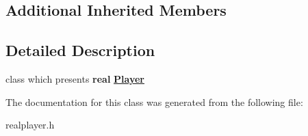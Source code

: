 \subsection*{Additional Inherited Members}


\subsection{Detailed Description}
class which presents {\bfseries{real}} {\bfseries{\mbox{\hyperlink{class_player}{Player}}}} 

The documentation for this class was generated from the following file\+:\begin{DoxyCompactItemize}
\item 
realplayer.\+h\end{DoxyCompactItemize}
